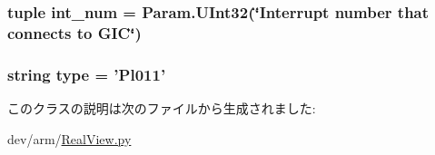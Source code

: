 \label{classRealView_1_1Pl011_a849551e71f91ca939d22d4c083f4c731}
\hypertarget{classRealView_1_1Pl011_a65fded6db751c1b9aa7168b29056e819}{
\subsubsection[{int\_\-num}]{\setlength{\rightskip}{0pt plus 5cm}tuple {\bf int\_\-num} = Param.UInt32(\char`\"{}Interrupt number that connects to GIC\char`\"{})}}
\label{classRealView_1_1Pl011_a65fded6db751c1b9aa7168b29056e819}
\hypertarget{classRealView_1_1Pl011_acce15679d830831b0bbe8ebc2a60b2ca}{
\subsubsection[{type}]{\setlength{\rightskip}{0pt plus 5cm}string {\bf type} = '{\bf Pl011}'}}
\label{classRealView_1_1Pl011_acce15679d830831b0bbe8ebc2a60b2ca}


このクラスの説明は次のファイルから生成されました:\begin{DoxyCompactItemize}
\item 
dev/arm/\hyperlink{RealView_8py}{RealView.py}\end{DoxyCompactItemize}
